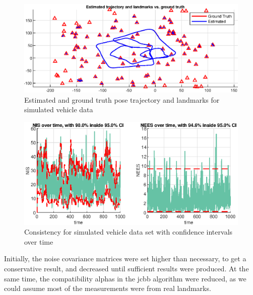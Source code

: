 \begin{figure}[!htb]
    \centering
    \includegraphics[width=0.6\linewidth]{figures/ga_3/sim_trajectory.eps}
    \caption{Estimated and ground truth pose trajectory and landmarks for simulated vehicle data}
    \label{fig:ga_3_sim_trajectory}
\end{figure}

\begin{figure}[!htb]
    \centering
    \includegraphics[width=0.8\linewidth]{figures/ga_3/sim_NIS.eps}
    \caption{Consistency for simulated vehicle data set with confidence intervals over time}
    \label{fig:ga_3_sim_NIS}
\end{figure}

Initially, the noise covariance matrices were set higher than necessary, to get a conservative result, and decreased until sufficient results were produced. At the same time, the compatibility alphas in the \acrshort{jcbb} algorithm were reduced, as we could assume most of the measurements were from real landmarks.



